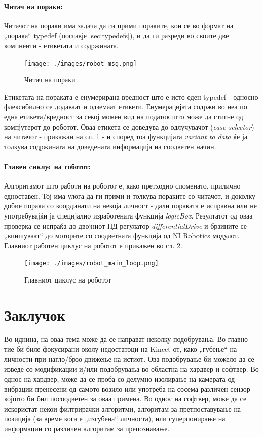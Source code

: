 \documentclass[11pt]{article}
\begin{document}
    \paragraph{Читач на пораки:\\}
      Читачот на пораки има задача да ги прими пораките, кои се во формат на „порака“ typedef (поглавје \ref{sec:typedefs}), и да ги разреди во своите две компненти - етикетата и содржината.
      \begin{figure}[H]
        \centering
        \texttt{[image: ./images/robot\_msg.png]}
        \caption{Читач на пораки}
        \label{fig:parser}
        \end{figure}
      Етикетата на пораката е енумерирана вредност што е исто еден typedef - односно флексибилно се додаваат и одземаат етикети. Енумерацијата содржи во неа по една етикета/вредност за секој можен вид на податок што може да стигне од компјутерот до роботот. Оваа етикета се доведува до одлучувачот (\textit{case selector}) на читачот - прикажан на сл. \ref{fig:parser} - и според тоа функцијата \textit{variant to data} ќе ја толкува содржината на доведената информација на соодветен начин.

    \paragraph{Главен cиклус на rоботот:\\}
      Алгоритамот што работи на роботот е, како претходно споменато, прилично едноставен. Тој има улога да ги прими и толкува пораките со читачот, и доколку добие порака со координати на некоја личност - дали пораката е исправна или не употребувајќи ја специјално изработената функција \textit{logicBox}. Резултатот од оваа проверка се испраќа до двојниот ПД регулатор \textit{differentialDrive} и брзините се „впишуваат“ до моторите со соодветната функција од NI Robotics модулот. Главниот работен циклус на роботот е прикажен во сл. \ref{fig:robot_main}.
      \begin{figure}[H]
        \centering
        \texttt{[image: ./images/robot\_main\_loop.png]}
        \caption{Главниот циклус на роботот}
        \label{fig:robot_main}
      \end{figure}

\newpage

\section{Заклучок}
  Во иднина, на оваа тема може да се направат неколку подобрувања. Во главно тие би биле фокусирани околу недостатоци на Kinect-от, како „губење“ на личности при нагло/брзо движење на истиот. Ова подобрување би можело да се изведе со модификации и/или подобрувања во областна на хардвер и софтвер. Во однос на хардвер, може да се проба со делумно изолирање на камерата од вибрации пренесени од самото возило или употреба на сосема различен сензор којшто би бил посоодветен за оваа примена. Во однос на софтвер, може да се искористат некои филтрирачки алгоритми, алгоритам за претпоставување на позиција (за време кога е „изгубена“ личноста), или суперпонирање на информации со различен алгоритам за препознавање.
\end{document}

